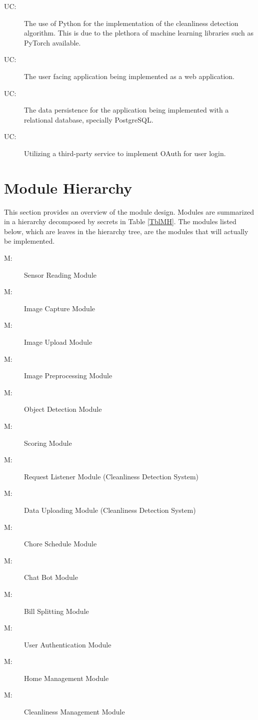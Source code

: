 \documentclass[12pt, titlepage]{article}
\newcounter{ucnum}
\newcommand{\uctheucnum}{UC\theucnum}
\newcounter{mnum}
\newcommand{\mthemnum}{M\themnum}
\begin{document}
\begin{description}
\item[ \uctheucnum \label{ucPython}:] The use of Python for the implementation of the cleanliness detection algorithm. This is due to the plethora of machine learning libraries such as PyTorch available.
\item[ \uctheucnum \label{ucWeb}:] The user facing application being implemented as a web application.
\item[ \uctheucnum \label{ucSql}:] The data persistence for the application being implemented with a relational database, specially PostgreSQL.
\item[ \uctheucnum \label{ucAuth}:]Utilizing a third-party service to implement OAuth for user login.
\end{description}

\section{Module Hierarchy} \label{SecMH}

This section provides an overview of the module design. Modules are summarized
in a hierarchy decomposed by secrets in Table \ref{TblMH}. The modules listed
below, which are leaves in the hierarchy tree, are the modules that will
actually be implemented.

\begin{description}
\item [ \mthemnum \label{mSR}:] Sensor Reading Module
\item [ \mthemnum \label{mIC}:] Image Capture Module
\item [ \mthemnum \label{mIU}:] Image Upload Module
\item [ \mthemnum \label{mIP}:] Image Preprocessing Module
\item [ \mthemnum \label{mOD}:] Object Detection Module
\item [ \mthemnum \label{mS}:] Scoring Module 
\item [ \mthemnum \label{mRL}:] Request Listener Module (Cleanliness Detection System)
\item [ \mthemnum \label{mDU}:] Data Uploading Module (Cleanliness Detection System)
\item [ \mthemnum \label{mCS}:] Chore Schedule Module
\item [ \mthemnum \label{mCB}:] Chat Bot Module
\item [ \mthemnum \label{mBS}:] Bill Splitting Module
\item [ \mthemnum \label{mUA}:] User Authentication Module
\item [ \mthemnum \label{mHM}:] Home Management Module
\item [ \mthemnum \label{mCM}:] Cleanliness Management Module
\end{description}
\end{document}
